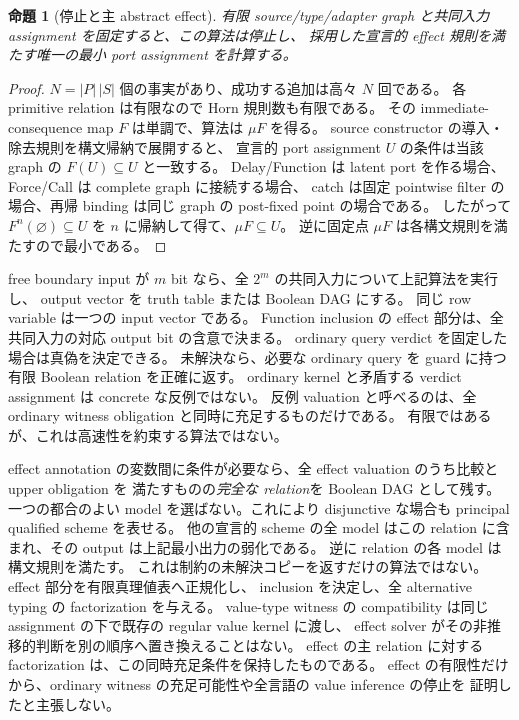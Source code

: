 \documentclass[11pt,a4paper]{article}
\newtheorem{theorem}{命題}[section]
\theoremstyle{remark}
\begin{document}
\begin{theorem}[停止と主 abstract effect]
有限 source/type/adapter graph と共同入力 assignment を固定すると、この算法は停止し、
採用した宣言的 effect 規則を満たす唯一の最小 port assignment を計算する。
\end{theorem}
\begin{proof}
$N=|P|\,|S|$ 個の事実があり、成功する追加は高々 $N$ 回である。
各 primitive relation は有限なので Horn 規則数も有限である。
その immediate-consequence map $F$ は単調で、算法は $\mu F$ を得る。
source constructor の導入・除去規則を構文帰納で展開すると、
宣言的 port assignment $U$ の条件は当該 graph の $F(U)\subseteq U$ と一致する。
Delay/Function は latent port を作る場合、Force/Call は complete graph に接続する場合、
catch は固定 pointwise filter の場合、再帰 binding は同じ graph の post-fixed point の場合である。
したがって $F^n(\varnothing)\subseteq U$ を $n$ に帰納して得て、$\mu F\subseteq U$。
逆に固定点 $\mu F$ は各構文規則を満たすので最小である。\qedhere
\end{proof}

free boundary input が $m$ bit なら、全 $2^m$ の共同入力について上記算法を実行し、
output vector を truth table または Boolean DAG にする。
同じ row variable は一つの input vector である。
Function inclusion の effect 部分は、全共同入力の対応 output bit の含意で決まる。
ordinary query verdict を固定した場合は真偽を決定できる。
未解決なら、必要な ordinary query を guard に持つ有限 Boolean relation を正確に返す。
ordinary kernel と矛盾する verdict assignment は concrete な反例ではない。
反例 valuation と呼べるのは、全 ordinary witness obligation と同時に充足するものだけである。
有限ではあるが、これは高速性を約束する算法ではない。

effect annotation の変数間に条件が必要なら、全 effect valuation のうち比較と upper obligation を
満たすものの\emph{完全な relation}を Boolean DAG として残す。
一つの都合のよい model を選ばない。これにより disjunctive な場合も principal qualified scheme を表せる。
他の宣言的 scheme の全 model はこの relation に含まれ、その output は上記最小出力の弱化である。
逆に relation の各 model は構文規則を満たす。
これは制約の未解決コピーを返すだけの算法ではない。effect 部分を有限真理値表へ正規化し、
inclusion を決定し、全 alternative typing の factorization を与える。
value-type witness の compatibility は同じ assignment の下で既存の regular value kernel に渡し、
effect solver がその非推移的判断を別の順序へ置き換えることはない。
effect の主 relation に対する factorization は、この同時充足条件を保持したものである。
effect の有限性だけから、ordinary witness の充足可能性や全言語の value inference の停止を
証明したと主張しない。
\end{document}
